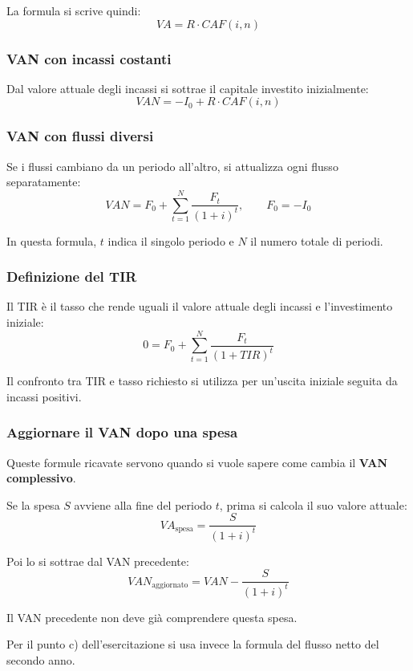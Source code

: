 \noindent
La formula si scrive quindi:
\[
    VA=R\cdot CAF(i,n)
\]

\subsubsection*{VAN con incassi costanti}

\noindent
Dal valore attuale degli incassi si sottrae
il capitale investito inizialmente:
\[
    VAN=-I_0+R\cdot CAF(i,n)
\]

\subsubsection*{VAN con flussi diversi}

\noindent
Se i flussi cambiano da un periodo all'altro,
si attualizza ogni flusso separatamente:
\[
    VAN
    =
    F_0+\sum_{t=1}^{N}\frac{F_t}{(1+i)^t},
    \qquad F_0=-I_0
\]

\noindent
In questa formula, $t$ indica il singolo periodo
e $N$ il numero totale di periodi.

\subsubsection*{Definizione del TIR}

\noindent
Il TIR è il tasso che rende uguali il valore attuale
degli incassi e l'investimento iniziale:
\[
    0
    =
    F_0+\sum_{t=1}^{N}\frac{F_t}{(1+TIR)^t}
\]

\noindent
Il confronto tra TIR e tasso richiesto si utilizza
per un'uscita iniziale seguita da incassi positivi.

\subsubsection*{Aggiornare il VAN dopo una spesa}

\noindent
Queste formule ricavate servono quando si vuole sapere
come cambia il \textbf{VAN complessivo}.

\noindent
Se la spesa $S$ avviene alla fine del periodo $t$,
prima si calcola il suo valore attuale:
\[
    VA_{\text{spesa}}=\frac{S}{(1+i)^t}
\]

\noindent
Poi lo si sottrae dal VAN precedente:
\[
    VAN_{\text{aggiornato}}
    =
    VAN-\frac{S}{(1+i)^t}
\]

\noindent
Il VAN precedente non deve già comprendere questa spesa.

\noindent
Per il punto c) dell'esercitazione si usa invece
la formula del flusso netto del secondo anno.

